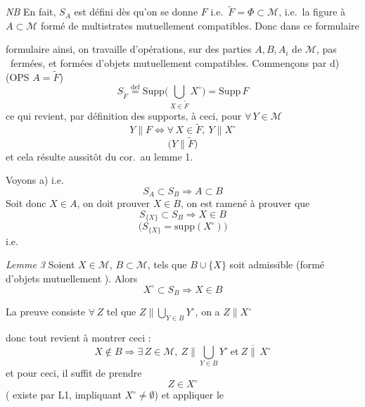 \documentclass[11pt,a4paper]{article}
\begin{document}
\emph{NB} En fait, $S_A$ est défini dès qu'on se donne \struck{\ill{}} $F$ i.e.\ $\widetilde{F} = \Phi \subset \mathcal{M}$, i.e.\ la figure \ill{} à \ill{} $A \subset \mathcal{M}$ formé de multistrates mutuellement compatibles. Donc dans ce formulaire \ill{} \ill{}

formulaire ainsi, on travaille  \ill{} d'opérations, \ill{} sur des parties $A, B, A_i$ de $\mathcal{M}$, pas \ fermées, et formées d'objets mutuellement compatibles. Commençons par d) (OPS $A = \widetilde{F}$)
\[
  S_{\widetilde{F}} \overset{\mathrm{def}}{=} \mathrm{Supp}\Big( \bigcup_{X \in \widetilde{F}} X^{\circ} \Big) = \mathrm{Supp}\, F
\]
ce qui revient, par définition des supports, à ceci, pour $\forall\, Y \in \mathcal{M}$
\[
  Y \parallel F \Longleftrightarrow \forall\, X \in \widetilde{F},\ Y \parallel X^{\circ}
\]
\[
  \big( Y \parallel \widetilde{F} \big)
\]
et cela résulte aussitôt du cor.\ au lemme 1.

Voyons a) i.e.
\[
  S_A \subset S_B \Longrightarrow A \subset B
\]
Soit donc $X \in A$, on doit prouver $X \in B$, on est ramené à prouver que
\[
  S_{\lbrace X \rbrace} \subset S_B \Longrightarrow X \in B
\]
\[
  \big( S_{\lbrace X \rbrace} = \mathrm{supp}(X^{\circ}) \big)
\]
i.e.

\emph{Lemme 3} Soient $X \in \mathcal{M}$, $B \subset \mathcal{M}$, tels que $B \cup \lbrace X \rbrace$ soit admissible (formé d'objets mutuellement  ). Alors
\[
  X^{\circ} \subset S_B \Longrightarrow X \in B
\]

La preuve \struck{\ill{}, \ill{} \ill{}} consiste \ill{} $\forall\, Z$ \struck{\ill{}} tel que $Z \parallel \bigcup_{Y \in B} Y^{\circ}$, on a $Z \parallel X^{\circ}$

donc tout revient à montrer ceci :
\[
  X \notin B \Longrightarrow \exists\, Z \in \mathcal{M},\ Z \parallel \bigcup_{Y \in B} Y^{\circ} \ \text{et}\ Z \overline{\parallel}\, X^{\circ}
\]
et pour ceci, il suffit de prendre
\[
  Z \in X^{\circ}
\]
(\struck{\ill{}} existe par L1, impliquant $X^{\circ} \neq \emptyset$)
et appliquer le
\end{document}
